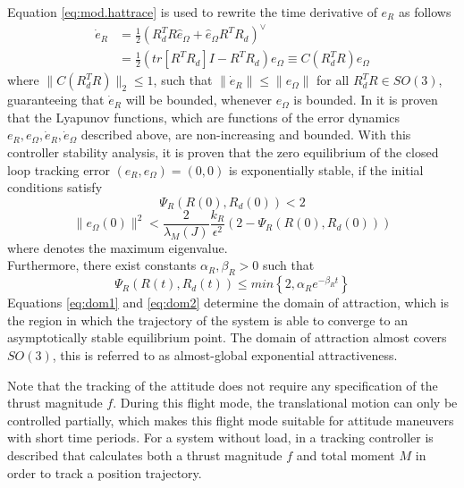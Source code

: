 Equation \ref{eq:mod.hattrace} is used to rewrite the time derivative of $ e_R $ as follows
 \begin{equation}\label{eq:con.deR}
 \begin{aligned}
 \dot{e}_R&=\frac{1}{2}(R_d^TR\hat{e}_\Omega+\hat{e}_\Omega R^TR_d)^\vee\\
 &=\frac{1}{2}(tr[R^TR_d]I-R^TR_d)e_\Omega \equiv C(R_d^TR)e_\Omega 
 \end{aligned}
 \end{equation}
where $ \parallel C(R_d^TR)\parallel_2\leq 1 $, such that $ \parallel\dot{e}_R\parallel\leq\parallel e_\Omega \parallel  $ for all $ R^T_dR\in SO(3) $, guaranteeing that $ \dot{e}_R $ will be bounded, whenever $ e_\Omega $ is bounded. 
In \cite{Lee2010} it is proven that the Lyapunov functions, which are functions of the error dynamics $ e_R,e_{\Omega},\dot{e}_R,\dot{e}_{\Omega}$ described above, are non-increasing and bounded. With this controller stability analysis, it is proven that the zero equilibrium of the closed loop tracking error $ (e_R,e_\Omega)=(0,0) $ is exponentially stable, if the initial conditions satisfy
\begin{equation}\label{eq:dom1}
\Psi_R(R(0),R_d(0))<2
\end{equation}
\begin{equation}\label{eq:dom2}
\parallel e_\Omega(0)\parallel^2<\frac{2}{\lambda_M(J)}\frac{k_R}{\epsilon^2}(2-\Psi_R(R(0),R_d(0)))
\end{equation}
where  denotes the maximum eigenvalue. \\
Furthermore, there exist constants $ \alpha_R,\beta_R>0 $ such that
\begin{equation}\label{eq:con.proofPsiR}
\Psi_R(R(t),R_d(t)) \leq min\left\lbrace 2,\alpha_Re^{-\beta_Rt}\right\rbrace 
\end{equation}
Equations \ref{eq:dom1} and \ref{eq:dom2} determine the domain of attraction, which is the region in which the trajectory of the system is able to converge to an asymptotically stable equilibrium point. 
The domain of attraction almost covers $ SO(3) $, this is referred to as almost-global exponential attractiveness.

Note that the tracking of the  attitude does not require any specification of the thrust magnitude $ f $. During this flight mode, the translational motion can only be controlled partially, which makes this flight mode suitable for attitude maneuvers with short time periods. For a  system without load, in \cite{Lee2010} a tracking controller is described that calculates both a thrust magnitude $ f $ and total moment $ M $ in order to track a  position trajectory.

